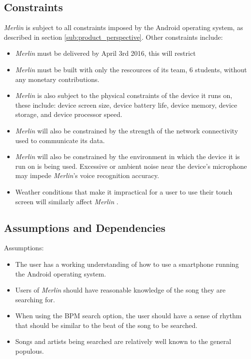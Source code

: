 \documentclass[]{article}
\newcommand{\merlin}{\textit{Merlin }}
\newcommand{\merlins}{\textit{Merlin}'s }
\begin{document}
\subsection{Constraints}
\label{sub:constraints}
	\merlin is subject to all constraints imposed by the Android operating system, as described in section \ref{sub:product_perspective}. Other constraints include:
	\begin{itemize}
	\cbstart
		\item  \merlin must be delivered by April 3rd 2016, this will restrict
		\item \merlin must be built with only the rescources of its team, 6 students, without any monetary contributions.
	\cbend 
		\item \merlin is also subject to the physical constraints of the device it runs on, these include: device screen size, device battery life, device memory, device storage, and device processor speed. 
		\item \merlin will also be constrained by the strength of the network connectivity used to communicate its data. 
		\item \merlin will also be constrained by the environment in which the device it is run on is being used. Excessive or ambient noise near the device's microphone may impede \merlins voice recognition accuracy. 
		\item Weather conditions that make it impractical for a user to use their touch screen will similarly affect \merlin.
	\end{itemize}

\subsection{Assumptions and Dependencies}
\label{sub:assumptions_and_dependencies}
Assumptions:
\begin{itemize}
	\item The user has a working understanding of how to use a smartphone running the Android operating system.
	\item Users of \merlin should have reasonable knowledge of the song they are searching for.
	\item When using the BPM search option, the user should have a sense of rhythm that should be similar to the beat of the song to be searched.
	\item Songs and artists being searched are relatively well known to the general populous.
\end{itemize}
\end{document}
